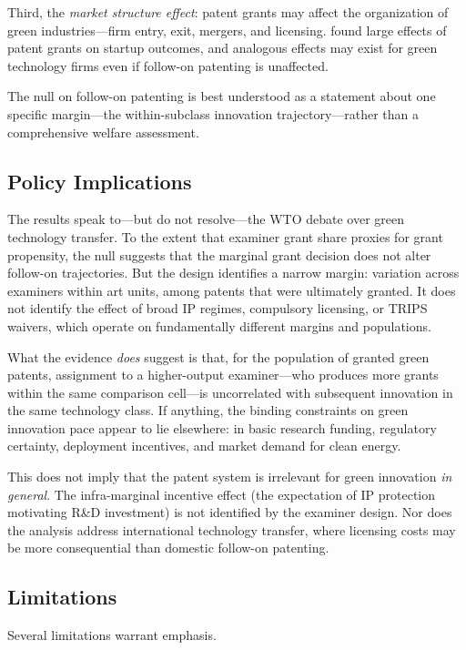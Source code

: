 \documentclass[12pt]{article}
\begin{document}
Third, the \emph{market structure effect}: patent grants may affect the organization of green industries---firm entry, exit, mergers, and licensing. \citet{farremensa2020} found large effects of patent grants on startup outcomes, and analogous effects may exist for green technology firms even if follow-on patenting is unaffected.

The null on follow-on patenting is best understood as a statement about one specific margin---the within-subclass innovation trajectory---rather than a comprehensive welfare assessment.

\subsection{Policy Implications}

The results speak to---but do not resolve---the WTO debate over green technology transfer. To the extent that examiner grant share proxies for grant propensity, the null suggests that the marginal grant decision does not alter follow-on trajectories. But the design identifies a narrow margin: variation across examiners within art units, among patents that were ultimately granted. It does not identify the effect of broad IP regimes, compulsory licensing, or TRIPS waivers, which operate on fundamentally different margins and populations.

What the evidence \emph{does} suggest is that, for the population of granted green patents, assignment to a higher-output examiner---who produces more grants within the same comparison cell---is uncorrelated with subsequent innovation in the same technology class. If anything, the binding constraints on green innovation pace appear to lie elsewhere: in basic research funding, regulatory certainty, deployment incentives, and market demand for clean energy.

This does not imply that the patent system is irrelevant for green innovation \emph{in general}. The infra-marginal incentive effect (the expectation of IP protection motivating R\&D investment) is not identified by the examiner design. Nor does the analysis address international technology transfer, where licensing costs may be more consequential than domestic follow-on patenting.

\subsection{Limitations}

Several limitations warrant emphasis.
\end{document}
